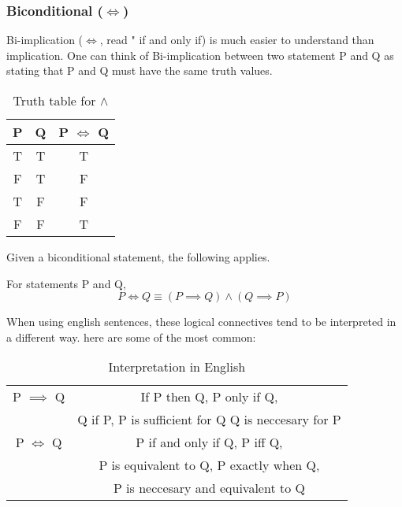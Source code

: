 \documentclass[a4paper]{article}
\begin{document}
\subsubsection{Biconditional ($\iff$)}
Bi-implication ($\iff$, read " if and only if) is much easier to understand than implication. One can think of Bi-implication between two statement P and Q as stating that P and Q must have the same truth values.

\begin{table}[htpb]
	\centering
	\caption{Truth table for $\wedge$}
	\label{tab:bi-implication table}
	\vspace{5pt}
	\begin{tabular}{c|c|c}
		P & Q & P $\iff$ Q\\ \hline
		T & T & T \\
		F & T & F \\
		T & F & F \\
		F & F & T \\
	\end{tabular}
\end{table}

Given a biconditional statement, the following applies.
\begin{tcolorbox}
For statements P and Q, \[
P \iff Q \equiv \left( P \implies Q \right) \wedge \left( Q \implies P \right)   \]	
\end{tcolorbox}

When using english sentences, these logical connectives tend to be interpreted in a different way. here are some of the most common:


\begin{table}[htpb]
	\centering
	\caption{Interpretation in English}	
	\label{tab:alternative-interpretation}
	\vspace{5pt}
	\begin{tabular}{c|c}
		P $\implies$ Q & If P then Q, P only if Q,\\
			       & Q if P, P is sufficient for Q Q is neccesary for P\\ \hline
		P $\iff$ Q & P if and only if Q, P iff Q,\\
			   & P is equivalent to Q, P exactly when Q,\\
			   & P is neccesary and equivalent to Q\\
	\end{tabular}
\end{table}
\end{document}
